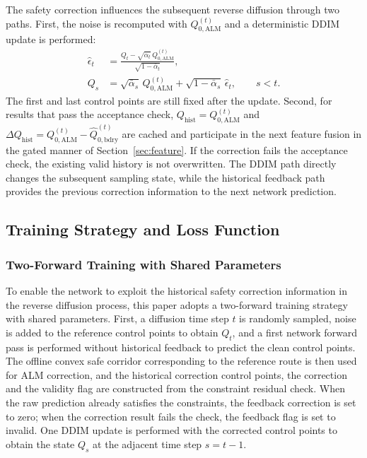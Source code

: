 \documentclass[journal]{IEEEtran}
\newcommand{\baralpha}{\bar{\alpha}}
\begin{document}
The safety correction influences the subsequent reverse diffusion through two paths. First, the noise is recomputed with $Q_{0,\mathrm{ALM}}^{(t)}$ and a deterministic DDIM update is performed:
\begin{equation}
\begin{aligned}
\widehat\epsilon_t&=
\frac{Q_t-\sqrt{\baralpha_t}\,Q_{0,\mathrm{ALM}}^{(t)}}{\sqrt{1-\baralpha_t}},\\
Q_s&=\sqrt{\baralpha_s}\,Q_{0,\mathrm{ALM}}^{(t)}
+\sqrt{1-\baralpha_s}\,\widehat\epsilon_t,
\qquad s<t.
\end{aligned}
\end{equation}
The first and last control points are still fixed after the update. Second, for results that pass the acceptance check, $Q_{\mathrm{hist}}=Q_{0,\mathrm{ALM}}^{(t)}$ and $\Delta Q_{\mathrm{hist}}=Q_{0,\mathrm{ALM}}^{(t)}-\widehat Q_{0,\mathrm{bdry}}^{(t)}$ are cached and participate in the next feature fusion in the gated manner of Section~\ref{sec:feature}. If the correction fails the acceptance check, the existing valid history is not overwritten. The DDIM path directly changes the subsequent sampling state, while the historical feedback path provides the previous correction information to the next network prediction.

\subsection{Training Strategy and Loss Function}
\label{sec:loss}

\subsubsection{Two-Forward Training with Shared Parameters}

To enable the network to exploit the historical safety correction information in the reverse diffusion process, this paper adopts a two-forward training strategy with shared parameters. First, a diffusion time step $t$ is randomly sampled, noise is added to the reference control points to obtain $Q_t$, and a first network forward pass is performed without historical feedback to predict the clean control points. The offline convex safe corridor corresponding to the reference route is then used for ALM correction, and the historical correction control points, the correction and the validity flag are constructed from the constraint residual check. When the raw prediction already satisfies the constraints, the feedback correction is set to zero; when the correction result fails the check, the feedback flag is set to invalid. One DDIM update is performed with the corrected control points to obtain the state $Q_s$ at the adjacent time step $s=t-1$.
\end{document}
